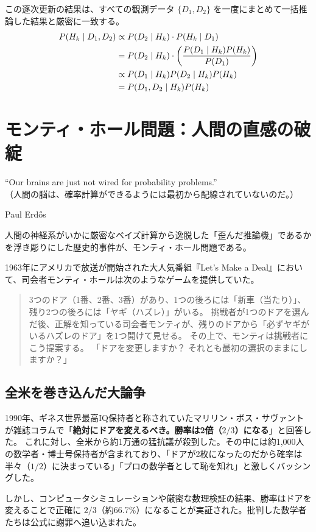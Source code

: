 この逐次更新の結果は、すべての観測データ $\{D_1, D_2\}$ を一度にまとめて一括推論した結果と厳密に一致する。
\begin{align}
P(H_k \mid D_1, D_2) 
&\propto P(D_2 \mid H_k) \cdot P(H_k \mid D_1) \notag \\
&= P(D_2 \mid H_k) \cdot \left( \frac{P(D_1 \mid H_k) P(H_k)}{P(D_1)} \right) \notag \\
&\propto P(D_1 \mid H_k) P(D_2 \mid H_k) P(H_k) \notag \\
&= P(D_1, D_2 \mid H_k) P(H_k)
\end{align}

\section{モンティ・ホール問題：人間の直感の破綻}
\epigraph{``Our brains are just not wired for probability problems.''\\
（人間の脳は、確率計算ができるようには最初から配線されていないのだ。）}{Paul Erd\H{o}s}

人間の神経系がいかに厳密なベイズ計算から逸脱した「歪んだ推論機」であるかを浮き彫りにした歴史的事件が、モンティ・ホール問題である。

1963年にアメリカで放送が開始された大人気番組『Let's Make a Deal』において、司会者モンティ・ホールは次のようなゲームを提供していた。
\begin{quote}
3つのドア（1番、2番、3番）があり、1つの後ろには「新車（当たり）」、残り2つの後ろには「ヤギ（ハズレ）」がいる。
挑戦者が1つのドアを選んだ後、正解を知っている司会者モンティが、残りのドアから「必ずヤギがいるハズレのドア」を1つ開けて見せる。
その上で、モンティは挑戦者にこう提案する。
「ドアを変更しますか？ それとも最初の選択のままにしますか？」
\end{quote}

\subsection{全米を巻き込んだ大論争}
1990年、ギネス世界最高IQ保持者と称されていたマリリン・ボス・サヴァントが雑誌コラムで「\textbf{絶対にドアを変えるべき。勝率は2倍（$2/3$）になる}」と回答した。
これに対し、全米から約1万通の猛抗議が殺到した。その中には約1,000人の数学者・博士号保持者が含まれており、「ドアが2枚になったのだから確率は半々（$1/2$）に決まっている」「プロの数学者として恥を知れ」と激しくバッシングした。

しかし、コンピュータシミュレーションや厳密な数理検証の結果、勝率はドアを変えることで正確に $2/3$（約66.7\%）になることが実証された。批判した数学者たちは公式に謝罪へ追い込まれた。

